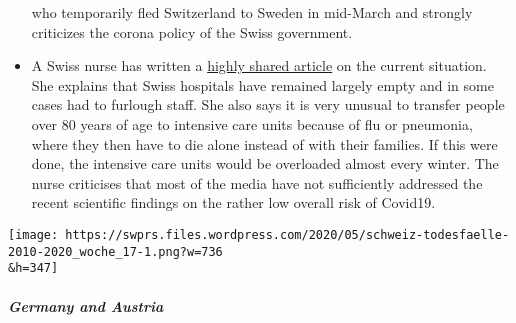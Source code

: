 \begin{itemize}
  who temporarily fled Switzerland to Sweden in mid-March and strongly
  criticizes the corona policy of the Swiss government.
\item
  A Swiss nurse has written a
  \href{https://www.facebook.com/simone.christinat/posts/10221314943115981}{highly
  shared article} on the current situation. She explains that Swiss
  hospitals have remained largely empty and in some cases had to
  furlough staff. She also says it is very unusual to transfer people
  over 80 years of age to intensive care units because of flu or
  pneumonia, where they then have to die alone instead of with their
  families. If this were done, the intensive care units would be
  overloaded almost every winter. The nurse criticises that most of the
  media have not sufficiently addressed the recent scientific findings
  on the rather low overall risk of Covid19.
\end{itemize}

\texttt{[image: https://swprs.files.wordpress.com/2020/05/schweiz-todesfaelle-2010-2020\_woche\_17-1.png?w=736\\\&h=347]}

\hypertarget{germany-and-austria}{%
\subparagraph{\texorpdfstring{\textbf{Germany and
Austria}}{Germany and Austria}}\label{germany-and-austria}}


